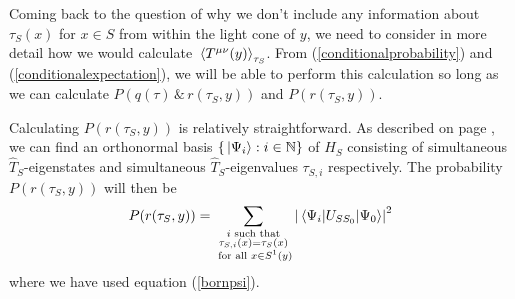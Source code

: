  Coming back to the question of why we don't include any information about $\tau_S(x)$ for $x\in S$ from within the light cone of $y$, we need to consider in more detail how we would calculate $\ev*{T^{\mu\nu}(y)}_{\tau_S}$. From (\ref{conditionalprobability}) and (\ref{conditionalexpectation}), we will be able to perform this calculation so long as we can calculate $P(q(\tau) \, \&\,  r(\tau_S,y))$ and $P(r(\tau_S,y))$. 
 
 Calculating $P(r(\tau_S,y))$ is relatively straightforward. As described on page \pageref{simultaneous}, we can find an orthonormal basis $\{\ket*{\Psi_{i}}:i\in\mathbb{N}\}$ of $H_S$ consisting of simultaneous $\hat{T}_S$-eigenstates and simultaneous $\hat{T}_S$-eigenvalues $\tau_{S,i}$ respectively. The probability $P(r(\tau_S,y))$ will then be  
 \begin{equation}\label{rProb}
 P(r(\tau_S,y))=\sum_{\substack{i \text{ such that} \\ \tau_{S,i}(x)=\tau_S(x)\\ \text{ for all }x\in S^1(y)}}\abs{\mel{\Psi_{i}}{U_{SS_0}}{\Psi_0}}^2
 \end{equation} where we have used equation (\ref{bornpsi}).

